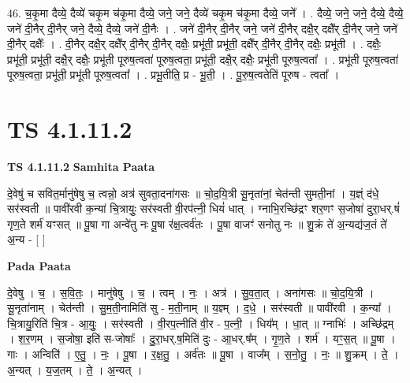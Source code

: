 \documentclass[17pt]{extarticle}
\begin{document}
46. च॒कृ॒मा दैव्ये॒ दैव्ये॑ चकृ॒म च॑कृ॒मा दैव्ये॒ जने॒ जने॒ दैव्ये॑ चकृ॒म च॑कृ॒मा दैव्ये॒ जने᳚ । . दैव्ये॒ जने॒ जने॒ दैव्ये॒ दैव्ये॒ जने॑ दी॒नैर् दी॒नैर् जने॒ दैव्ये॒ दैव्ये॒ जने॑ दी॒नैः । . जने॑ दी॒नैर् दी॒नैर् जने॒ जने॑ दी॒नैर् दक्षै॒र् दक्षै᳚र् दी॒नैर् जने॒ जने॑ दी॒नैर् दक्षैः᳚ । . दी॒नैर् दक्षै॒र् दक्षै᳚र् दी॒नैर् दी॒नैर् दक्षैः॒ प्रभू॑ती॒ प्रभू॑ती॒ दक्षै᳚र् दी॒नैर् दी॒नैर् दक्षैः॒ प्रभू॑ती । . दक्षैः॒ प्रभू॑ती॒ प्रभू॑ती॒ दक्षै॒र् दक्षैः॒ प्रभू॑ती पूरुष॒त्वता॑ पूरुष॒त्वता॒ प्रभू॑ती॒ दक्षै॒र् दक्षैः॒ प्रभू॑ती पूरुष॒त्वता᳚ । . प्रभू॑ती पूरुष॒त्वता॑ पूरुष॒त्वता॒ प्रभू॑ती॒ प्रभू॑ती पूरुष॒त्वता᳚ । . प्रभू॒तीति॒ प्र - भू॒ती॒ । . पू॒रु॒ष॒त्वतेति॑ पूरुष - त्वता᳚ । \newline
\pagebreak
{}

\section{ TS 4.1.11.2 }

\textbf{TS 4.1.11.2 } \newline
\textbf{Samhita Paata} \newline

दे॒वेषु॑ च सवित॒र्मानु॑षेषु च॒ त्वन्नो॒ अत्र॑ सुवता॒दना॑गसः ॥ चो॒द॒यि॒त्री सू॒नृता॑नां॒ चेत॑न्ती सुमती॒नां । य॒ज्ञ्ं द॑धे॒ सर॑स्वती ॥ पावी॑रवी क॒न्या॑ चि॒त्रायुः॒ सर॑स्वती वी॒रप॑त्नी॒ धियं॑ धात् । ग्नाभि॒रच्छि॑द्रꣳ शर॒णꣳ स॒जोषा॑ दुरा॒धर्.षं॑ गृण॒ते शर्म॑ यꣳसत् ॥ पू॒षा गा अन्वे॑तु नः पू॒षा र॑क्ष॒त्वर्व॑तः । पू॒षा वाजꣳ॑ सनोतु नः ॥ शु॒क्रं ते॑ अ॒न्यद्य॑ज॒तं ते॑ अ॒न्य - [  ] \newline

\textbf{Pada Paata} \newline

दे॒वेषु । च॒ । स॒वि॒तः॒ । मानु॑षेषु । च॒ । त्वम् । नः॒ । अत्र॑ । सु॒व॒ता॒त् । अना॑गसः ॥ चो॒द॒यि॒त्री । सू॒नृता॑नाम् । चेत॑न्ती । सु॒म॒ती॒नामिति॑ सु - म॒ती॒नाम् ॥ य॒ज्ञ्म् । द॒धे॒ । सर॑स्वती ॥ पावी॑रवी । क॒न्या᳚ । चि॒त्रायु॒रिति॑ चि॒त्र - आ॒युः॒ । सर॑स्वती । वी॒रप॒त्नीति॑ वी॒र - प॒त्नी॒ । धिय᳚म् । धा॒त् ॥ ग्नाभिः॑ । अच्छि॑द्रम् । श॒र॒णम् । स॒जोषा॒ इति॑ स-जोषाः᳚ । दु॒रा॒धर्.ष॒मिति॑ दुः - आ॒धर्.ष᳚म् । गृ॒ण॒ते । शर्म॑ । यꣳ॒॒स॒त् ॥ पू॒षा । गाः । अन्विति॑ । ए॒तु॒ । नः॒ । पू॒षा । र॒क्ष॒तु॒ । अर्व॑तः ॥ पू॒षा । वाज᳚म् । स॒नो॒तु॒ । नः॒ ॥ शु॒क्रम् । ते॒ । अ॒न्यत् । य॒ज॒तम् । ते॒ । अ॒न्यत् ।  \newline
\end{document}
